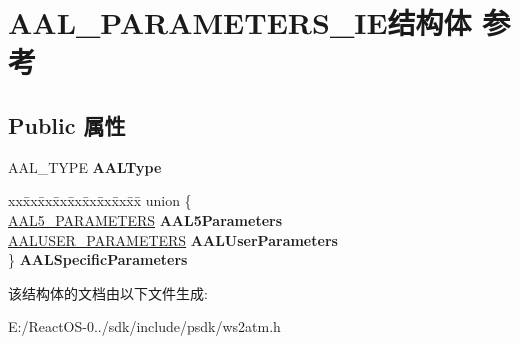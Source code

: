 \hypertarget{struct_a_a_l___p_a_r_a_m_e_t_e_r_s___i_e}{}\section{A\+A\+L\+\_\+\+P\+A\+R\+A\+M\+E\+T\+E\+R\+S\+\_\+\+I\+E结构体 参考}
\label{struct_a_a_l___p_a_r_a_m_e_t_e_r_s___i_e}
\subsection*{Public 属性}
\begin{DoxyCompactItemize}
\item 
\mbox{\label{struct_a_a_l___p_a_r_a_m_e_t_e_r_s___i_e_a5526ae07728aba4320f519cffcea3b54}} 
A\+A\+L\+\_\+\+T\+Y\+PE {\bfseries A\+A\+L\+Type}
\item 
\mbox{\label{struct_a_a_l___p_a_r_a_m_e_t_e_r_s___i_e_a15d0b09befd3931128947842df31c172}} 
\begin{tabbing}
xx\=xx\=xx\=xx\=xx\=xx\=xx\=xx\=xx\=\kill
union \{\\
\>\hyperlink{struct_a_a_l5___p_a_r_a_m_e_t_e_r_s}{AAL5\_PARAMETERS} {\bfseries AAL5Parameters}\\
\>\hyperlink{struct_a_a_l_u_s_e_r___p_a_r_a_m_e_t_e_r_s}{AALUSER\_PARAMETERS} {\bfseries AALUserParameters}\\
\} {\bfseries AALSpecificParameters}\\

\end{tabbing}\end{DoxyCompactItemize}


该结构体的文档由以下文件生成\+:\begin{DoxyCompactItemize}
\item 
E\+:/\+React\+O\+S-\/0../sdk/include/psdk/ws2atm.\+h\end{DoxyCompactItemize}
